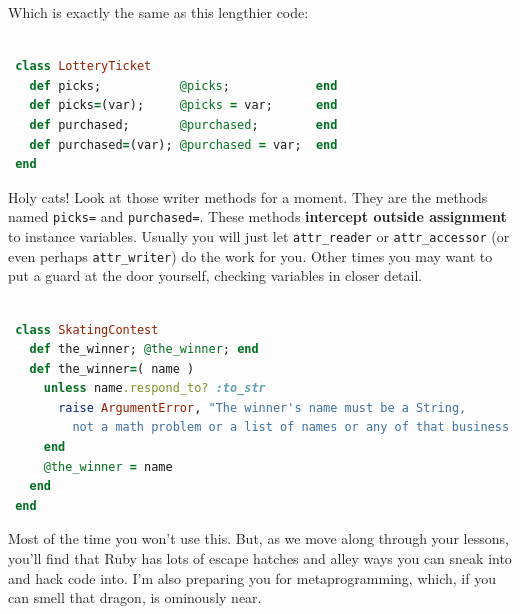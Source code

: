 \documentclass[10pt,twoside]{report}
\begin{document}
Which is exactly the same as this lengthier code:


\begin{lstlisting}[basicstyle=\ttfamily\color{basiccolor},
    commentstyle = \ttfamily\color{commentcolor},
    keywordstyle=\ttfamily\color{keywordscolor},
    stringstyle=\color{stringcolor},
    language=Ruby,
    basicstyle=\small\ttfamily,
    showstringspaces=false,
  ]

 class LotteryTicket
   def picks;           @picks;            end
   def picks=(var);     @picks = var;      end
   def purchased;       @purchased;        end
   def purchased=(var); @purchased = var;  end
 end

\end{lstlisting}


Holy cats!  Look at those writer methods for a moment.  They are the
methods named \lstinline[breaklines=true]|picks=| and
\lstinline[breaklines=true]|purchased=|.  These methods {\bf intercept
  outside assignment} to instance variables. Usually you will just let
\lstinline[breaklines=true]|attr_reader| or
\lstinline[breaklines=true]|attr_accessor| (or even perhaps
\lstinline[breaklines=true]|attr_writer|) do the work for you. Other
times you may want to put a guard at the door yourself, checking
variables in closer detail.


\begin{lstlisting}[basicstyle=\ttfamily\color{basiccolor},
    commentstyle = \ttfamily\color{commentcolor},
    keywordstyle=\ttfamily\color{keywordscolor},
    stringstyle=\color{stringcolor},
    language=Ruby,
    basicstyle=\small\ttfamily,
    showstringspaces=false,
  ]

 class SkatingContest
   def the_winner; @the_winner; end
   def the_winner=( name )
     unless name.respond_to? :to_str
       raise ArgumentError, "The winner's name must be a String,
         not a math problem or a list of names or any of that business."
     end
     @the_winner = name
   end
 end

\end{lstlisting}


Most of the time you won't use this.  But, as we move along through
your lessons, you'll find that Ruby has lots of escape hatches and
alley ways you can sneak into and hack code into.  I'm also preparing
you for metaprogramming, which, if you can smell that dragon, is
ominously near.  
\end{document}
